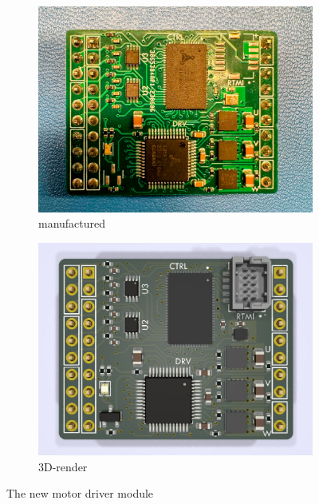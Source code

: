 \documentclass[runningheads]{llncs}
\begin{document}
\begin{figure}
    \centering
    \begin{subfigure}[b]{0.45\textwidth}
         \centering
         \includegraphics[width=\textwidth]{images/motor-driver.jpg}
         \caption{manufactured}
    \end{subfigure}
    \hfill
    \begin{subfigure}[b]{0.5\textwidth}
        \centering
        \includegraphics[width=\textwidth]{images/motor-driver-render.jpg}
        \caption{3D-render}
    \end{subfigure}
    \caption{The new motor driver module}
    \label{fig:motor-driver}
\end{figure}
\end{document}
